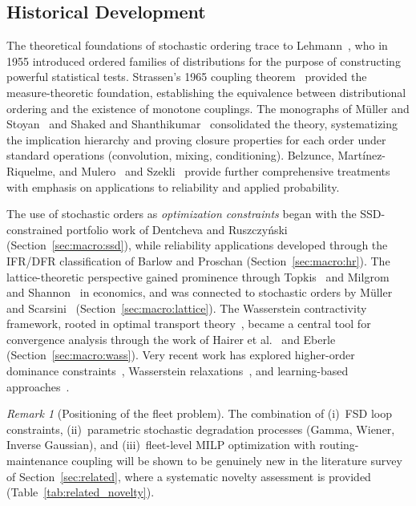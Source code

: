 \documentclass[11pt,a4paper]{article}
\theoremstyle{plain}
\theoremstyle{definition}
\theoremstyle{remark}
\newtheorem{remark}[theorem]{Remark}
\begin{document}
\subsection{Historical Development}
\label{sec:macro:history}

The theoretical foundations of stochastic ordering trace to
Lehmann~\cite{lehmann1955}, who in 1955 introduced ordered families of
distributions for the purpose of constructing powerful statistical
tests.  Strassen's 1965 coupling theorem~\cite{strassen1965} provided
the measure-theoretic foundation, establishing the equivalence between
distributional ordering and the existence of monotone couplings.  The
monographs of M\"{u}ller and Stoyan~\cite{muller2002} and Shaked and
Shanthikumar~\cite{shaked2007} consolidated the theory, systematizing
the implication hierarchy and proving closure properties for each
order under standard operations (convolution, mixing, conditioning).
Belzunce, Mart\'{i}nez-Riquelme, and Mulero~\cite{belzunce2016}
and Szekli~\cite{szekli1995} provide further comprehensive treatments
with emphasis on applications to reliability and applied probability.

The use of stochastic orders as \emph{optimization constraints}
began with the SSD-constrained portfolio work of Dentcheva and
Ruszczy\'{n}ski (Section~\ref{sec:macro:ssd}), while reliability
applications developed through the IFR/DFR classification of
Barlow and Proschan (Section~\ref{sec:macro:hr}).  The lattice-theoretic
perspective gained prominence through Topkis~\cite{topkis1998} and
Milgrom and Shannon~\cite{milgrom1994} in economics, and was connected
to stochastic orders by M\"{u}ller and Scarsini~\cite{muller2006}
(Section~\ref{sec:macro:lattice}).  The Wasserstein contractivity
framework, rooted in optimal transport theory~\cite{villani2009},
became a central tool for convergence analysis through the work of
Hairer et al.~\cite{hairer2011} and Eberle~\cite{eberle2016}
(Section~\ref{sec:macro:wass}).  Very recent work has explored
higher-order dominance constraints~\cite{lakshmanan2025},
Wasserstein relaxations~\cite{dentchevayi2025}, and learning-based
approaches~\cite{hu2022}.

\begin{remark}[Positioning of the fleet problem]
\label{rem:novelty}
The combination of (i)~FSD loop constraints, (ii)~parametric
stochastic degradation processes (Gamma, Wiener, Inverse Gaussian),
and (iii)~fleet-level MILP optimization with routing-maintenance
coupling will be shown to be genuinely new in the literature
survey of Section~\ref{sec:related}, where a systematic novelty
assessment is provided (Table~\ref{tab:related_novelty}).
\end{remark}
\end{document}
